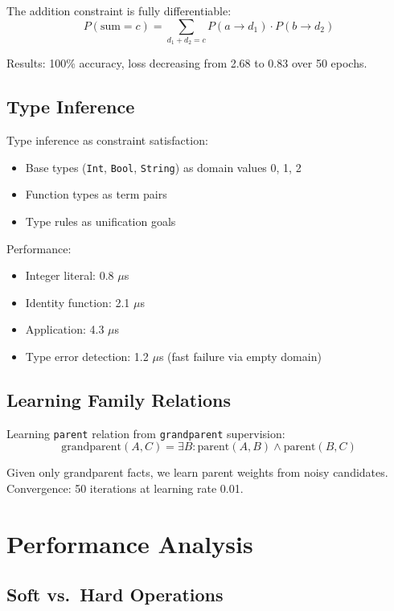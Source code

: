 \documentclass[11pt,a4paper]{article}
\begin{document}
The addition constraint is fully differentiable:
\[
P(\text{sum} = c) = \sum_{d_1 + d_2 = c} P(a \to d_1) \cdot P(b \to d_2)
\]

Results: 100\% accuracy, loss decreasing from 2.68 to 0.83 over 50 epochs.

\subsection{Type Inference}
\label{sec:type_infer_chirho}

Type inference as constraint satisfaction:
\begin{itemize}
  \item Base types (\texttt{Int}, \texttt{Bool}, \texttt{String}) as domain values 0, 1, 2
  \item Function types as term pairs
  \item Type rules as unification goals
\end{itemize}

Performance:
\begin{itemize}
  \item Integer literal: 0.8 $\mu$s
  \item Identity function: 2.1 $\mu$s
  \item Application: 4.3 $\mu$s
  \item Type error detection: 1.2 $\mu$s (fast failure via empty domain)
\end{itemize}

\subsection{Learning Family Relations}
\label{subsec:family_chirho}

Learning \texttt{parent} relation from \texttt{grandparent} supervision:
\[
\text{grandparent}(A, C) = \exists B: \text{parent}(A, B) \land \text{parent}(B, C)
\]

Given only grandparent facts, we learn parent weights from noisy candidates.
Convergence: 50 iterations at learning rate 0.01.

\section{Performance Analysis}
\label{sec:performance_chirho}

\subsection{Soft vs.\ Hard Operations}
\label{subsec:soft_hard_chirho}
\end{document}
